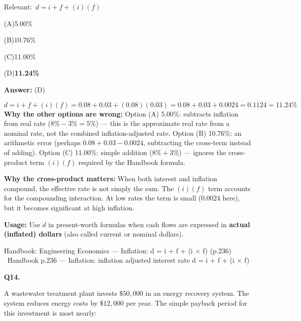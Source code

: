 \documentclass[11pt]{article}
\newcommand{\correct}[1]{\textbf{#1}\;{\color{accent}$\checkmark$}}
\newcommand{\optline}[2]{\par\noindent\hspace{1.2em}(#1)\hspace{0.6em}#2}
\begin{document}
{\small\color{soft}Relevant:}\ $d = i + f + (i)(f)$\par\vspace{3pt}
\optline{A}{5.00\%}
\optline{B}{10.76\%}
\optline{C}{11.00\%}
\optline{D}{\correct{11.24\%}}
\par\vspace{3pt}
\vspace{2pt}\par\noindent\colorbox{boxbg}{\parbox{\dimexpr\linewidth-2\fboxsep\relax}{%
\vspace{2pt}\textbf{Answer:} (D)\par\vspace{2pt}
{\small \[d = i + f + (i)(f) = 0.08 + 0.03 + (0.08)(0.03) = 0.08 + 0.03 + 0.0024 = 0.1124 = 11.24\%\]
\textbf{Why the other options are wrong:} Option (A) 5.00\%: subtracts inflation from real rate ($8\% - 3\% = 5\%$) --- this is the approximate real rate from a nominal rate, not the combined inflation-adjusted rate. Option (B) 10.76\%: an arithmetic error (perhaps $0.08 + 0.03 - 0.0024$, subtracting the cross-term instead of adding). Option (C) 11.00\%: simple addition ($8\% + 3\%$) --- ignores the cross-product term $(i)(f)$ required by the Handbook formula.\par
\textbf{Why the cross-product matters:} When both interest and inflation compound, the effective rate is not simply the sum. The $(i)(f)$ term accounts for the compounding interaction. At low rates the term is small ($0.0024$ here), but it becomes significant at high inflation.\par
\textbf{Usage:} Use $d$ in present-worth formulas when cash flows are expressed in \textbf{actual (inflated) dollars} (also called current or nominal dollars).\par}\par\vspace{2pt}
{\footnotesize\color{soft}Handbook: Engineering Economics --- Inflation: d = i + f + (i $\times$ f) (p.236) \textbullet\ Handbook p.236 --- Inflation: inflation adjusted interest rate d = i + f + (i $\times$ f)}\vspace{2pt}
}}
\vspace{9pt}
\filbreak
\textbf{\color{accent}Q14.}\par\vspace{2pt}
A wastewater treatment plant invests $\$50{,}000$ in an energy recovery system. The system reduces energy costs by $\$12{,}000$ per year. The simple payback period for this investment is most nearly:\par\par\vspace{3pt}
\end{document}
